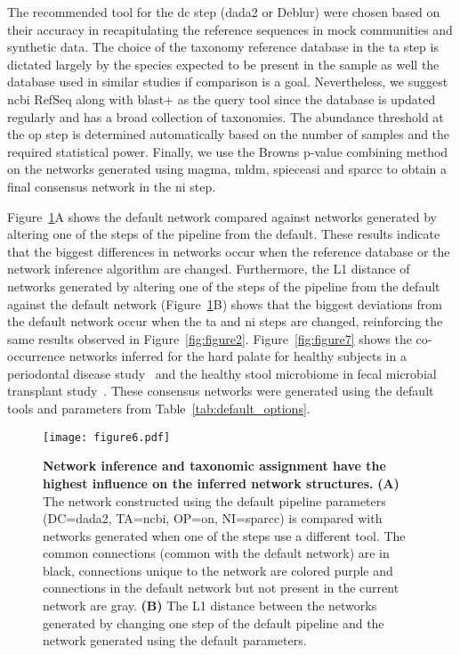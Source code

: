   The recommended tool for the \ac{dc} step (\ac{dada2} or Deblur) were chosen based on their accuracy in recapitulating the reference sequences in mock communities and synthetic data.
  The choice of the taxonomy reference database in the \ac{ta} step is dictated largely by the species expected to be present in the sample as well the database used in similar studies if comparison is a goal.
  Nevertheless, we suggest \ac{ncbi} RefSeq along with blast+ as the query tool since the database is updated regularly and has a broad collection of taxonomies.
  The abundance threshold at the \ac{op} step is determined automatically based on the number of samples and the required statistical power.
  Finally, we use the Browns p-value combining method on the networks generated using \ac{magma}, \ac{mldm}, \ac{spieceasi} and \ac{sparcc} to obtain a final consensus network in the \ac{ni} step.

  Figure~\ref{fig:figure6}A shows the default network compared against networks generated by altering one of the steps of the pipeline from the default.
  These results indicate that the biggest differences in networks occur when the reference database or the network inference algorithm are changed.
  Furthermore, the L1 distance of networks generated by altering one of the steps of the pipeline from the default against the default network (Figure~\ref{fig:figure6}B) shows that the biggest deviations from the default network occur when the \ac{ta} and \ac{ni} steps are changed, reinforcing the same results observed in Figure~\ref{fig:figure2}. Figure~\ref{fig:figure7} shows the co-occurrence networks inferred for the hard palate for healthy subjects in a periodontal disease study~\cite{Chen2018} and the healthy stool microbiome in fecal microbial transplant study~\cite{Kang2017}. These consensus networks were generated using the default tools and parameters from Table~\ref{tab:default_options}.

  \begin{figure}[h]
    \centering
    \texttt{[image: figure6.pdf]}
    \caption{
      \textbf{Network inference and taxonomic assignment have the highest influence on the inferred network structures.}
      \textbf{(A)} The network constructed using the default pipeline parameters (DC=\ac{dada2}, TA=\ac{ncbi}, OP=on, NI=\ac{sparcc}) is compared with networks generated when one of the steps use a different tool.
      The common connections (common with the default network) are in black, connections unique to the network are colored purple and connections in the default network but not present in the current network are gray.
      \textbf{(B)} The L1 distance between the networks generated by changing one step of the default pipeline and the network generated using the default parameters.
    }
    \label{fig:figure6}
  \end{figure}


